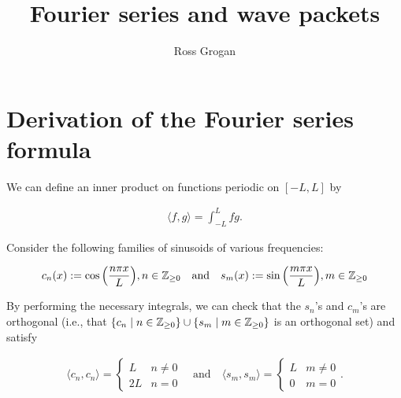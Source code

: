 \documentclass{article}
\title{Fourier series and wave packets}
\author{Ross Grogan}
\date{}
\begin{document}
	
\maketitle

\section*{Derivation of the Fourier series formula}

We can define an inner product on functions periodic on $[-L, L]$ by 

\begin{align*}
	\langle f, g \rangle = \int_{-L}^{L} fg.
\end{align*}

Consider the following families of sinusoids of various frequencies:

\begin{align*}
	c_n(x) := \cos\Big(\frac{n\pi x}{L}\Big), n \in \mathbb{Z}_{\geq 0}
	\quad \text{and} \quad
	s_m(x) := \sin\Big(\frac{m\pi x}{L}\Big), m \in \mathbb{Z}_{\geq 0}
\end{align*}

By performing the necessary integrals, we can check that the $s_n$'s and $c_m$'s are orthogonal (i.e., that ${\{c_n \mid n \in \mathbb{Z}_{\geq 0}\} \cup \{s_m \mid m \in \mathbb{Z}_{\geq 0}\}}$ is an orthogonal set) and satisfy

\begin{align*}
	\langle c_n, c_n \rangle = 
	\begin{cases}
		L & n \neq 0 \\
		2L & n = 0
	\end{cases}
	\quad \text{and} \quad
	\langle s_m, s_m \rangle =
	\begin{cases}
		L & m \neq 0 \\
		0 & m = 0
	\end{cases}.
\end{align*}

\end{document}
